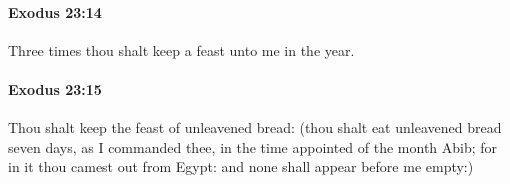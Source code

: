 		\paragraph{Exodus 23:14} %
			\label{EXODUS-23-14}

			Three times thou shalt keep a feast unto me in the year.


		\paragraph{Exodus 23:15} %
			\label{EXODUS-23-15}

			Thou shalt keep the feast of unleavened bread: (thou shalt eat unleavened bread seven days, as I commanded thee, in the time appointed of the month Abib; for in it thou camest out from Egypt: and none shall appear before me empty:)


